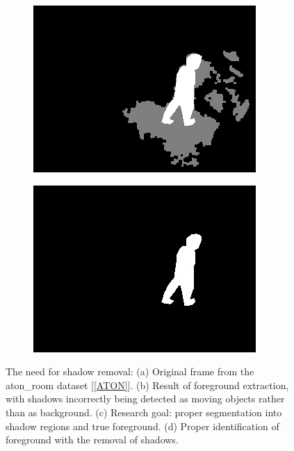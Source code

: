 \begin{figure}
\begin{subfigure}{.49\linewidth}
    \includegraphics[width=1\linewidth]{figures/background/room_0295_shadows.jpg}
    \caption{}
  \end{subfigure}
  \hfill
  \begin{subfigure}{.49\linewidth}
  \centering
    \includegraphics[width=1\linewidth]{figures/background/room_0295_clean.jpg}
    \caption{}
  \end{subfigure}
  \caption{The need for shadow removal: (a) Original frame from the aton\_room dataset [\ref{ATON}]. (b) Result of foreground extraction, with shadows incorrectly being detected as moving objects rather than as background. (c) Research goal: proper segmentation into shadow regions and true foreground. (d) Proper identification of foreground with the removal of shadows.}
\label{fig:nonshadow}
\end{figure}

